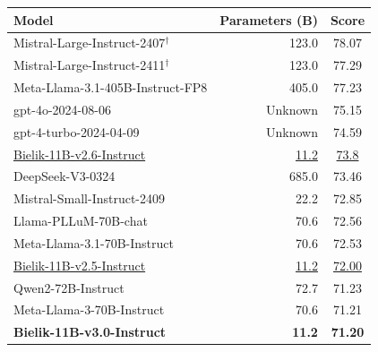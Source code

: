 \documentclass{article}
\begin{document}
\begin{table}[t]
    \centering
    \small
    \begin{tabular}{lrc}
    \toprule
    \textbf{Model} & \textbf{Parameters (B)} & \textbf{Score} \\
    \midrule
    Mistral-Large-Instruct-2407$^{\dagger}$ & 123.0 & 78.07 \\
    Mistral-Large-Instruct-2411$^{\dagger}$ & 123.0 & 77.29 \\
    Meta-Llama-3.1-405B-Instruct-FP8 & 405.0 & 77.23 \\
    gpt-4o-2024-08-06 & Unknown & 75.15 \\
    gpt-4-turbo-2024-04-09 & Unknown & 74.59 \\
    \underline{Bielik-11B-v2.6-Instruct} & \underline{11.2} & \underline{73.8} \\
    DeepSeek-V3-0324 & 685.0 & 73.46 \\
    Mistral-Small-Instruct-2409 & 22.2 & 72.85 \\
    Llama-PLLuM-70B-chat & 70.6 & 72.56 \\
    Meta-Llama-3.1-70B-Instruct & 70.6 & 72.53 \\
    \underline{Bielik-11B-v2.5-Instruct} & \underline{11.2} & \underline{72.00} \\
    Qwen2-72B-Instruct & 72.7 & 71.23 \\
    Meta-Llama-3-70B-Instruct & 70.6 & 71.21 \\
    \textbf{Bielik-11B-v3.0-Instruct} & \textbf{11.2} & \textbf{71.20} \\


\end{tabular}
\end{table}
\end{document}
